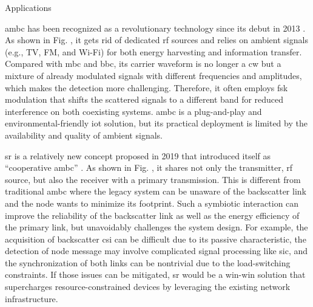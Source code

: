 \begin{section}{}
\begin{subsection}{Applications}
		\begin{subsubsection}{}
			\gls{ambc} has been recognized as a revolutionary technology since its debut in 2013 \cite{Liu2013b}.
			As shown in Fig. , it gets rid of dedicated \gls{rf} sources and relies on ambient signals (e.g., TV, FM, and Wi-Fi) for both energy harvesting and information transfer.
			Compared with \gls{mbc} and \gls{bbc}, its carrier waveform is no longer a \gls{cw} but a mixture of already modulated signals with different frequencies and amplitudes, which makes the detection more challenging.
			Therefore, it often employs \gls{fsk} modulation that shifts the scattered signals to a different band for reduced interference on both coexisting systems.
			\gls{ambc} is a plug-and-play and environmental-friendly \gls{iot} solution, but its practical deployment is limited by the availability and quality of ambient signals.
		\end{subsubsection}

		\begin{subsubsection}{}
			\gls{sr} is a relatively new concept proposed in 2019 that introduced itself as ``cooperative \gls{ambc}'' \cite{Guo2019b}.
			As shown in Fig. , it shares not only the transmitter, \gls{rf} source, but also the receiver with a primary transmission.
			This is different from traditional \gls{ambc} where the legacy system can be unaware of the backscatter link and the node wants to minimize its footprint.
			Such a symbiotic interaction can improve the reliability of the backscatter link as well as the energy efficiency of the primary link, but unavoidably challenges the system design.
			For example, the acquisition of backscatter \gls{csi} can be difficult due to its passive characteristic, the detection of node message may involve complicated signal processing like \gls{sic}, and the synchronization of both links can be nontrivial due to the load-switching constraints.
			If those issues can be mitigated, \gls{sr} would be a win-win solution that supercharges resource-constrained devices by leveraging the existing network infrastructure.
		\end{subsubsection}
	\end{subsection}
\end{section}
